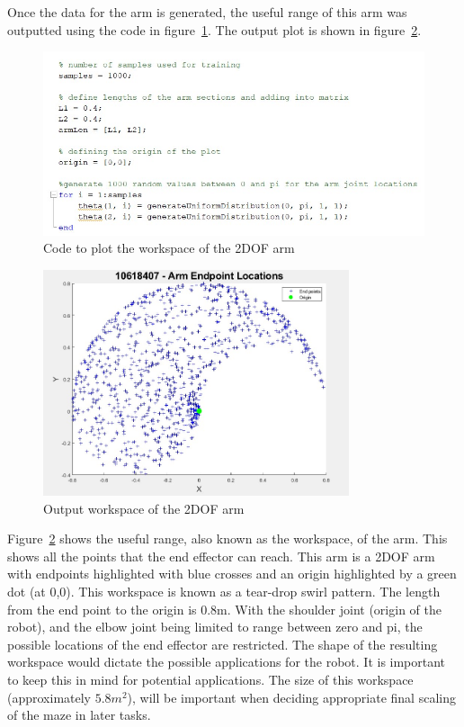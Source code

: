 \documentclass [11pt]{article}
\begin{document}
Once the data for the arm is generated, the useful range of this arm was outputted using the code in figure~\ref{fig:codeToPlotWorkspace}. The output plot is shown in figure~\ref{fig:outputtedWorkSpace}.

\begin{figure}[H]
\centerline{\includegraphics[width=12cm]{GenerateArmDataCode}}
\caption{Code to plot the workspace of the 2DOF arm}
\label{fig:codeToPlotWorkspace}
\end{figure}

\begin{figure}[H]
\centerline{\includegraphics[width=9cm]{arm_endpoint}}
\caption{Output workspace of the 2DOF arm}
\label{fig:outputtedWorkSpace}
\end{figure}

Figure~\ref{fig:outputtedWorkSpace} shows the useful range, also known as the workspace, of the arm. This shows all the points that the end effector can reach. This arm is a 2DOF arm with endpoints highlighted with blue crosses and an origin highlighted by a green dot (at 0,0). This workspace is known as a tear-drop swirl pattern. The length from the end point to the origin is 0.8m. With the shoulder joint (origin of the robot), and the elbow joint being limited to range between zero and pi, the possible locations of the end effector are restricted. The shape of the resulting workspace would dictate the possible applications for the robot. It is important to keep this in mind for potential applications. The size of this workspace (approximately $5.8m^2$), will be important when deciding appropriate final scaling of the maze in later tasks. 
\end{document}
